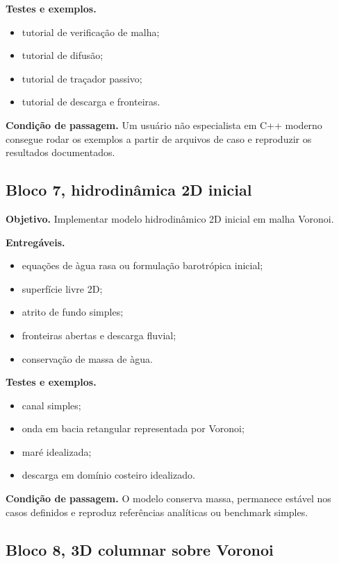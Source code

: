 \documentclass[11pt,a4paper]{article}
\begin{document}
\textbf{Testes e exemplos.}
\begin{itemize}
  \item tutorial de verifica\c{c}\~ao de malha;
  \item tutorial de difus\~ao;
  \item tutorial de tra\c{c}ador passivo;
  \item tutorial de descarga e fronteiras.
\end{itemize}

\textbf{Condi\c{c}\~ao de passagem.} Um usu\'ario n\~ao especialista em C++ moderno consegue rodar os exemplos a partir de arquivos de caso e reproduzir os resultados documentados.

\subsection*{Bloco 7, hidrodin\^amica 2D inicial}

\textbf{Objetivo.} Implementar modelo hidrodin\^amico 2D inicial em malha Voronoi.

\textbf{Entreg\'aveis.}
\begin{itemize}
  \item equa\c{c}\~oes de \`agua rasa ou formula\c{c}\~ao barotr\'opica inicial;
  \item superf\'icie livre 2D;
  \item atrito de fundo simples;
  \item fronteiras abertas e descarga fluvial;
  \item conserva\c{c}\~ao de massa de \`agua.
\end{itemize}

\textbf{Testes e exemplos.}
\begin{itemize}
  \item canal simples;
  \item onda em bacia retangular representada por Voronoi;
  \item mar\'e idealizada;
  \item descarga em dom\'inio costeiro idealizado.
\end{itemize}

\textbf{Condi\c{c}\~ao de passagem.} O modelo conserva massa, permanece est\'avel nos casos definidos e reproduz refer\^encias anal\'iticas ou benchmark simples.

\subsection*{Bloco 8, 3D columnar sobre Voronoi}
\end{document}
